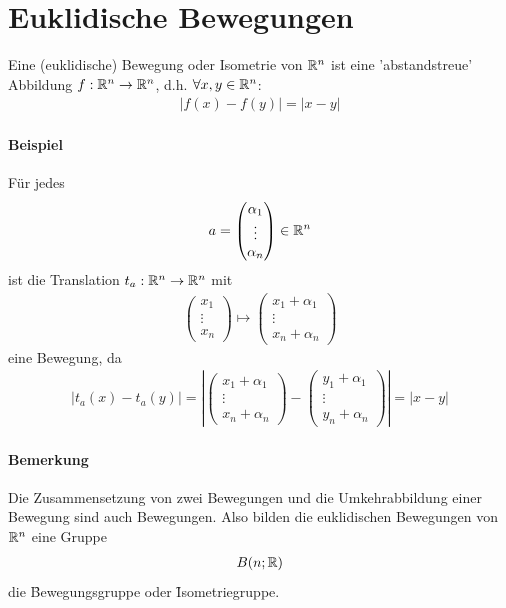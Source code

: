 \section{Euklidische Bewegungen} %
Eine (euklidische) Bewegung oder Isometrie von $\mathbb{R}^n$ ist eine 'abstandstreue' Abbildung $f: \mathbb{R}^n \rightarrow \mathbb{R}^n$, d.h. $\forall x, y \in \mathbb{R}^n$:
\begin{align}
|f(x) - f(y)| = |x-y|
\end{align}

\paragraph{Beispiel}
Für jedes 
\begin{align}
a = \begin{pmatrix} \alpha_1 \\ \vdots \\ \alpha_n \end{pmatrix} \in \mathbb{R}^n
\end{align}
ist die Translation $t_a: \mathbb{R}^n \rightarrow \mathbb{R}^n$ mit
\begin{align}
\begin{pmatrix} x_1 \\ \vdots \\ x_n \end{pmatrix} \mapsto \begin{pmatrix} x_1 + \alpha_1 \\ \vdots \\ x_n + \alpha_n \end{pmatrix}
\end{align}
eine Bewegung, da
\begin{align}
|t_a(x) - t_a(y)| = |\begin{pmatrix} x_1 + \alpha_1 \\ \vdots \\ x_n + \alpha_n \end{pmatrix} - \begin{pmatrix} y_1 + \alpha_1 \\ \vdots \\ y_n + \alpha_n \end{pmatrix}| = |x - y|
\end{align}

\paragraph{Bemerkung}
Die Zusammensetzung von zwei Bewegungen und die Umkehrabbildung einer Bewegung sind auch Bewegungen. Also bilden die euklidischen Bewegungen von $\mathbb{R}^n$ eine Gruppe
\begin{align}
B(n; \mathbb{R})
\end{align}
die \f{Bewegungsgruppe} oder \f{Isometriegruppe}.

